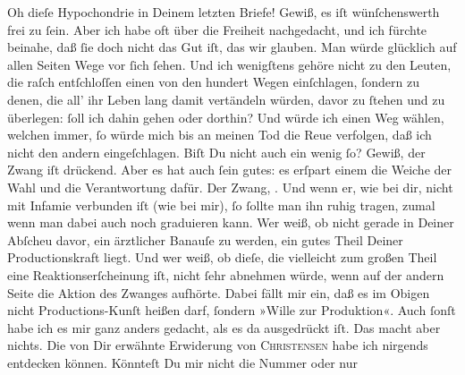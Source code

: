 \begin{ledgroupsized}[t]{13cm}
           {\pb}Oh dieſe Hypochondrie in Deinem letzten Briefe!
               Gewiß, es iſt wünſchenswerth frei zu ſein. Aber ich habe oft über die Freiheit
               nachgedacht, und ich fürchte beinahe, daß ſie doch nicht das Gut iſt, \introOben{}das\introOben{} wir glauben. Man würde glücklich auf allen Seiten Wege
               vor ſich ſehen. Und ich wenigſtens gehöre nicht zu den Leuten, die raſch entſchloſſen
               einen von den hundert Wegen einſchlagen, ſondern zu denen, die all’ ihr Leben lang
               damit vertändeln würden, davor zu ſtehen {\pb}und zu
               überlegen: ſoll ich dahin gehen oder dorthin? Und würde ich einen Weg wählen, welchen
               immer, ſo würde mich bis an meinen Tod die Reue verfolgen, daß ich nicht den andern
               eingeſchlagen. Biſt Du nicht auch ein wenig ſo? Gewiß, der Zwang iſt drückend. Aber
               es hat auch ſein gutes: es erſpart einem die Weiche der Wahl und die Verantwortung
               dafür. Der Zwang, \label{K_L02621-3v}\label{K_L02621-3h}. Und wenn er, wie bei dir, nicht mit Infamie verbunden iſt (wie
               bei mir), ſo ſollte man ihn {\pb}ruhig tragen, zumal
               wenn man dabei auch noch graduieren kann. Wer weiß, ob nicht gerade in Deiner Abſcheu
               davor, ein ärztlicher  Banauſe zu werden, ein
               gutes Theil Deiner Productionskraft liegt. Und wer weiß, ob dieſe, die vielleicht zum
               großen Theil eine Reaktionserſcheinung iſt, nicht ſehr abnehmen würde, wenn auf der
               andern Seite die Aktion des Zwanges aufhörte. Dabei fällt mir ein, daß es im Obigen
               nicht Productions-Kunſt heißen darf, ſondern »Wille zur Produktion«. Auch ſonſt habe
               ich es mir ganz {\pb}anders gedacht, als es da
               ausgedrückt iſt. Das macht aber nichts.\pend
           \pstart
           Die von Dir erwähnte Erwiderung\pwindex{Christensen, Hjalmar 1869-05-05 – 1925-12-29@\textsc{Christensen, Hjalmar} (1869-05-05 – 1925-12-29), \emph{Kritiker, Kunstschriftsteller}!Erwiderung]1894?@\strich\emph{[Erwiderung]} {[}1894?{]}|pwv} von \textsc{Christensen} habe ich nirgends entdecken können. Könnteſt Du mir nicht die Nummer oder nur

\end{ledgroupsized}
